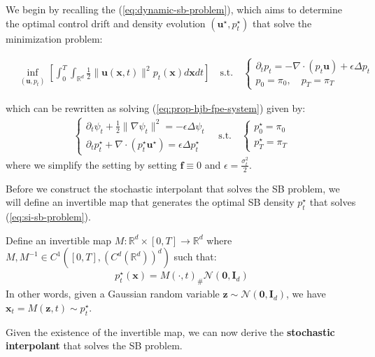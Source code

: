 \documentclass{article}
\begin{document}
We begin by recalling the (\ref{eq:dynamic-sb-problem}), which aims to determine the optimal control drift and density evolution $(\boldsymbol{u}^\star, p_t^\star)$ that solve the minimization problem: 
\begin{small}
\begin{align}
    &\inf_{(\boldsymbol{u}, p_t)}\left[\int_0^T\int_{\mathbb{R}^d}\frac{1}{2}\|\boldsymbol{u}(\boldsymbol{x},t)\|^2p_t(\boldsymbol{x})d\boldsymbol{x}dt \right]\quad\text{s.t.}\quad \begin{cases}
        \partial_tp_t=-\nabla\cdot (p_t\boldsymbol{u})+ \epsilon\Delta p_t\\
        p_0=\pi_0, \quad p_T=\pi_T
    \end{cases}
    \label{eq:si-sb-problem}
\end{align}
\end{small}
which can be rewritten as solving (\ref{eq:prop-hjb-fpe-system}) given by:
\begin{align}
    \begin{cases}
        \partial_t\psi_t+\frac{1}{2} \|\nabla\psi_t\|^2=-\epsilon\Delta \psi_t\\
        \partial_t p_t^\star+\nabla\cdot (p_t^\star\boldsymbol{u}^\star)=\epsilon\Delta p^\star_t
    \end{cases}\quad \text{s.t.}\quad \begin{cases}
        p^\star_0=\pi_0\\
        p^\star_T=\pi_T
    \end{cases}\label{eq:si-hjb-fpe}
\end{align}
where we simplify the setting by setting $\boldsymbol{f}\equiv 0$ and $\epsilon =\frac{\sigma^2_t}{2}$.

Before we construct the stochastic interpolant that solves the SB problem, we will define an invertible map that generates the optimal SB density $p_t^\star$ that solves (\ref{eq:si-sb-problem}).
\begin{definition}\label{def:interp-invertable-map}
    Define an invertible map $M: \mathbb{R}^d\times[0,T]\to \mathbb{R}^d$ where $M, M^{-1}\in C^1([0,T], (C^d(\mathbb{R}^d))^d)$ such that:
    \begin{align}
        p^\star_t(\boldsymbol{x})=M(\cdot, t)_{\#}\mathcal{N}(\boldsymbol{0}, \boldsymbol{I}_d)
    \end{align}
    In other words, given a Gaussian random variable $\boldsymbol{z}\sim \mathcal{N}(\boldsymbol{0}, \boldsymbol{I}_d)$, we have $\boldsymbol{x}_t=M(\boldsymbol{z},t)\sim p^\star_t$.
\end{definition}
Given the existence of the invertible map, we can now derive the \textbf{stochastic interpolant} that solves the SB problem.
\end{document}
